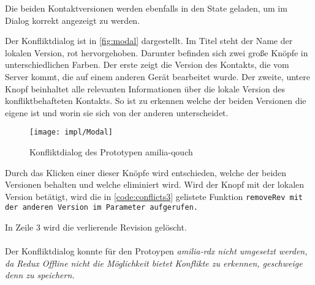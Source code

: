 Die beiden Kontaktversionen werden ebenfalls in den State geladen, um im Dialog korrekt angezeigt zu werden.
%
\begin{center}
  
\end{center}
%
Der Konfliktdialog ist in \autoref{fig:modal} dargestellt.
Im Titel steht der Name der lokalen Version, rot hervorgehoben.
Darunter befinden sich zwei große Knöpfe in unterschiedlichen Farben.
Der erste zeigt die Version des Kontakts, die vom Server kommt, die auf einem anderen Gerät bearbeitet wurde.
Der zweite, untere Knopf beinhaltet alle relevanten Informationen über die lokale Version des konfliktbehafteten Kontakts.
So ist zu erkennen welche der beiden Versionen die eigene ist und worin sie sich von der anderen unterscheidet.
%
\begin{figure}[H]
  \centering
  \texttt{[image: impl/Modal]}
  \grayRule
  \caption{Konfliktdialog des Prototypen amilia-qouch}
  \label{fig:modal}
\end{figure}
%
Durch das Klicken einer dieser Knöpfe wird entschieden, welche der beiden Versionen behalten und welche eliminiert wird.
Wird der Knopf mit der lokalen Version betätigt, wird die in \autoref{code:conflicts3} gelistete Funktion \tt{removeRev} mit der anderen Version im Parameter aufgerufen.
%
\begin{center}
  
\end{center}
%
In Zeile 3 wird die verlierende Revision gelöscht.\\\\
%
%
Der Konfliktdialog konnte für den Protoypen \it{amilia-rdx} nicht umgesetzt werden, da Redux Offline nicht die Möglichkeit bietet Konflikte zu erkennen, geschweige denn zu speichern.